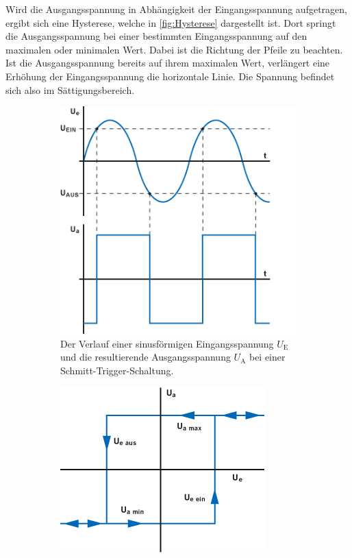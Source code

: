 Wird die Ausgangsspannung in Abhängigkeit der Eingangsspannung aufgetragen, ergibt sich eine Hysterese, welche in \autoref{fig:Hysterese} dargestellt ist. %
Dort springt die Ausgangsspannung bei einer bestimmten Eingangsspannung auf den maximalen oder minimalen Wert. Dabei ist die Richtung der Pfeile zu beachten. Ist die Ausgangsspannung bereits auf ihrem maximalen Wert, verlängert eine Erhöhung der Eingangsspannung die horizontale Linie. Die Spannung befindet sich also im Sättigungsbereich. %

\begin{figure}
    \centering
    \begin{subfigure}{0.48\textwidth}
        \centering
        \includegraphics[width=0.75\linewidth]{./figures/Kurvenverlauf.png}
        \caption{Der Verlauf einer sinusförmigen Eingangsspannung $U_\text{E}$ und die resultierende Ausgangsspannung $U_\text{A}$ bei einer Schmitt-Trigger-Schaltung. \cite{SchmittTrigger}}
        \label{fig:Kurvenverlauf}
    \end{subfigure}
    \begin{subfigure}{0.48\textwidth}
        \centering
        \includegraphics[width=0.8\linewidth]{./figures/Hysterese.png}

\end{subfigure}
\end{figure}

